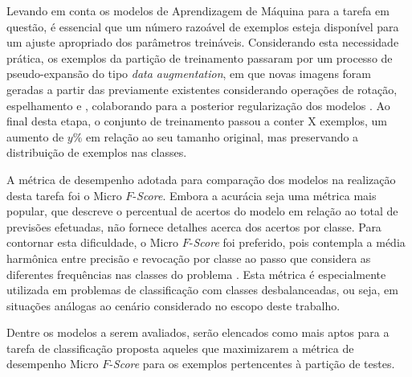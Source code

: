 Levando em conta os modelos de Aprendizagem de Máquina para a tarefa em questão, é essencial que um número razoável de exemplos esteja disponível para um ajuste apropriado dos parâmetros treináveis. Considerando esta necessidade prática, os exemplos da partição de treinamento passaram por um processo de pseudo-expansão do tipo \emph{data augmentation}, em que novas imagens foram geradas a partir das previamente existentes considerando operações de rotação, espelhamento e , colaborando para a posterior regularização dos modelos \cite{Chollet:Livro}. Ao final desta etapa, o conjunto de treinamento passou a conter X exemplos, um aumento de $y\%$ em relação ao seu tamanho original, mas preservando a distribuição de exemplos nas classes.


A métrica de desempenho adotada para comparação dos modelos na realização desta tarefa foi o Micro $F$-\emph{Score}. Embora a acurácia seja uma métrica mais popular, que descreve o percentual de acertos do modelo em relação ao total de previsões efetuadas, não fornece detalhes acerca dos acertos por classe. Para contornar esta dificuldade, o Micro $F$-\emph{Score} foi preferido, pois contempla a média harmônica entre precisão e revocação por classe ao passo que considera as diferentes frequências nas classes do problema \cite{Kubat:Livro}. Esta métrica é especialmente utilizada em problemas de classificação com classes desbalanceadas, ou seja, em situações análogas ao cenário considerado no escopo deste trabalho.

Dentre os modelos a serem avaliados, serão elencados como mais aptos para a tarefa de classificação proposta aqueles que maximizarem a métrica de desempenho Micro $F$-\emph{Score}  para os exemplos pertencentes à partição de testes.
